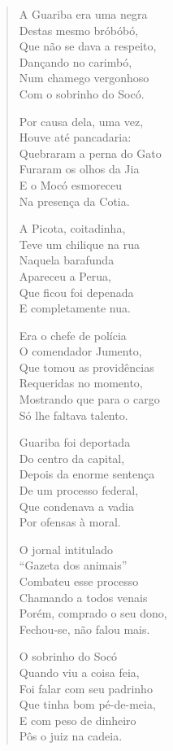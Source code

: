 \begin{verse}
A Guariba era uma negra\\
Destas mesmo bróbóbó,\\
Que não se dava a respeito,\\
Dançando no carimbó,\\
Num chamego vergonhoso\\
Com o sobrinho do Socó.

Por causa dela, uma vez,\\
Houve até pancadaria:\\
Quebraram a perna do Gato\\
Furaram os olhos da Jia\\
E o Mocó esmoreceu\\
Na presença da Cotia.

A Picota, coitadinha,\\
Teve um chilique na rua\\
Naquela barafunda\\
Apareceu a Perua,\\
Que ficou foi depenada\\
E completamente nua.


Era o chefe de polícia\\
O comendador Jumento,\\
Que tomou as providências\\
Requeridas no momento,\\
Mostrando que para o cargo\\
Só lhe faltava talento.

Guariba foi deportada\\
Do centro da capital,\\
Depois da enorme sentença\\
De um processo federal,\\
Que condenava a vadia\\
Por ofensas à moral.

O jornal intitulado\\
“Gazeta dos animais”\\
Combateu esse processo\\
Chamando a todos venais\\
Porém, comprado o seu dono,\\
Fechou-se, não falou mais.

O sobrinho do Socó \\
Quando viu a coisa feia,\\
Foi falar com seu padrinho\\
Que tinha bom pé-de-meia,\\
E com peso de dinheiro\\
Pôs o juiz na cadeia.



\end{verse}
